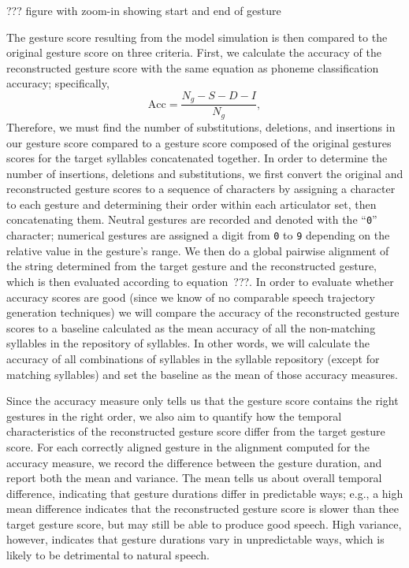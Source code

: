 ??? figure with zoom-in showing start and end of gesture

The gesture score resulting from the model simulation
is then compared to the original gesture score
on three criteria.
First, we calculate the accuracy
of the reconstructed gesture score
with the same equation as phoneme classification accuracy;
specifically,
\begin{equation}
  \text{Acc} = \frac{N_g - S - D - I}{N_g},
\end{equation}
Therefore, we must find the number of
substitutions, deletions, and insertions
in our gesture score compared to
a gesture score composed of
the original gestures scores
for the target syllables
concatenated together.
In order to determine the number of
insertions, deletions and substitutions,
we first convert the original
and reconstructed gesture scores
to a sequence of characters
by assigning a character to each gesture
and determining their order
within each articulator set,
then concatenating them.
Neutral gestures are recorded
and denoted with the ``\texttt{0}'' character;
numerical gestures are assigned
a digit from \texttt{0} to \texttt{9}
depending on the relative value
in the gesture's range.
We then do a global pairwise alignment
of the string determined
from the target gesture
and the reconstructed gesture,
which is then evaluated
according to equation~???.
In order to evaluate whether
accuracy scores are good
(since we know of no comparable
speech trajectory generation techniques)
we will compare the accuracy
of the reconstructed gesture scores
to a baseline calculated as
the mean accuracy of all the
non-matching syllables in the
repository of syllables.
In other words, we will calculate
the accuracy of all combinations
of syllables in the syllable repository
(except for matching syllables)
and set the baseline as the mean
of those accuracy measures.

Since the accuracy measure only tells us
that the gesture score contains
the right gestures in the right order,
we also aim to quantify
how the temporal characteristics
of the reconstructed gesture score
differ from the target gesture score.
For each correctly aligned gesture
in the alignment computed
for the accuracy measure,
we record the difference
between the gesture duration,
and report both the mean and variance.
The mean tells us about
overall temporal difference,
indicating that gesture durations
differ in predictable ways;
e.g., a high mean difference
indicates that
the reconstructed gesture score
is slower than thee target gesture score,
but may still be able to
produce good speech.
High variance, however,
indicates that
gesture durations vary in unpredictable ways,
which is likely to be detrimental
to natural speech.

